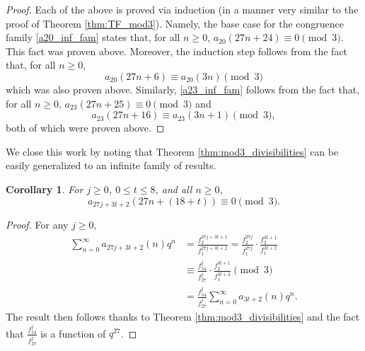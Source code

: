\documentclass[10pt, reqno]{amsart}
\theoremstyle{theorem}
\newtheorem{corollary}[theorem]{Corollary}
\theoremstyle{definition}
\theoremstyle{example}
\begin{document}
\begin{proof}
Each of the above is proved via induction (in a manner very similar to the proof of Theorem \ref{thm:TF_mod3}).  Namely, the base case for the congruence family \eqref{a20_inf_fam} states that, for all $n\geq 0$, $a_{20}(27n+24) \equiv 0 \pmod{3}$.  This fact was proven above.  Moreover, the induction step follows from the fact that, for all $n\geq 0$, 
$$a_{20}(27n+6) \equiv a_{20}(3n) \pmod{3}$$ 
which was also proven above.  Similarly, \eqref{a23_inf_fam} follows from the fact that, for all $n\geq 0$, $a_{23}(27n+25)\equiv 0 \pmod{3}$ and 
$$a_{23}(27n+16) \equiv a_{23}(3n+1) \pmod{3},$$ 
both of which were proven above.  
\end{proof}
\noindent
We close this work by noting that Theorem \ref{thm:mod3_divisibilities} can be easily generalized to an infinite family of results.  

\begin{corollary}
\label{mod3_fullgeneralization}
For $j\geq 0$, $0\leq t\leq 8$, and all $n\geq 0$, 
$$a_{27j+3t+2}(27n+(18+t)) \equiv 0 \pmod{3}.$$ 
\end{corollary}

\begin{proof}
For any $j\geq 0$, 
\begin{align*}
\sum_{n=0}^\infty a_{27j+3t+2}(n)q^n
&= 
\frac{f_2^{27j+3t+1}}{f_1^{27j+3t+2}} 
= 
\frac{f_2^{27j}}{f_1^{27j}}\cdot \frac{f_2^{3t+1}}{f_1^{3t+2}} \\
&\equiv 
\frac{f_{54}^{j}}{f_{27}^{j}}\cdot \frac{f_2^{3t+1}}{f_1^{3t+2}} \pmod{3} \\
&= 
\frac{f_{54}^{j}}{f_{27}^{j}}\sum_{n=0}^\infty a_{3t+2}(n)q^n.
\end{align*}
The result then follows thanks to Theorem \ref{thm:mod3_divisibilities} and the fact that $\frac{f_{54}^{j}}{f_{27}^{j}}$ is a function of $q^{27}$.  
\end{proof}
\end{document}
